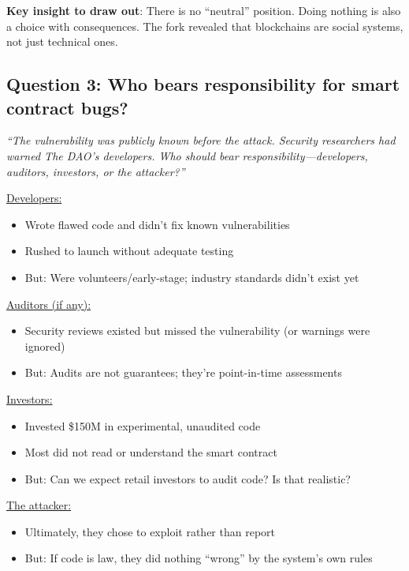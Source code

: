 \documentclass[11pt]{article}
\begin{document}
\medskip
\noindent\textbf{Key insight to draw out}: There is no ``neutral'' position. Doing nothing is also a choice with consequences. The fork revealed that blockchains are social systems, not just technical ones.

\subsection*{Question 3: Who bears responsibility for smart contract bugs?}

\textit{``The vulnerability was publicly known before the attack. Security researchers had warned The DAO's developers. Who should bear responsibility---developers, auditors, investors, or the attacker?''}

\medskip
\noindent\underline{Developers:}
\begin{itemize}[leftmargin=*]
\item Wrote flawed code and didn't fix known vulnerabilities
\item Rushed to launch without adequate testing
\item But: Were volunteers/early-stage; industry standards didn't exist yet
\end{itemize}

\medskip
\noindent\underline{Auditors (if any):}
\begin{itemize}[leftmargin=*]
\item Security reviews existed but missed the vulnerability (or warnings were ignored)
\item But: Audits are not guarantees; they're point-in-time assessments
\end{itemize}

\medskip
\noindent\underline{Investors:}
\begin{itemize}[leftmargin=*]
\item Invested \$150M in experimental, unaudited code
\item Most did not read or understand the smart contract
\item But: Can we expect retail investors to audit code? Is that realistic?
\end{itemize}

\medskip
\noindent\underline{The attacker:}
\begin{itemize}[leftmargin=*]
\item Ultimately, they chose to exploit rather than report
\item But: If code is law, they did nothing ``wrong'' by the system's own rules
\end{itemize}
\end{document}
